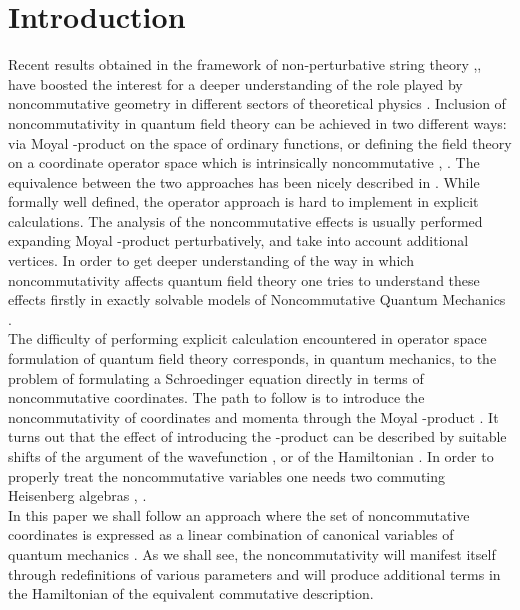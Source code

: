 \documentclass[a4paper,aps,prd,preprint]{revtex4}
\begin{document}
\section{Introduction}
Recent results obtained in the framework of non-perturbative string theory
\cite{witten},\cite{sw}, have boosted the interest for a deeper 
understanding of the role played by noncommutative geometry in different 
sectors of theoretical physics \cite{schw}. 
Inclusion of noncommutativity in quantum field theory 
can be achieved in two different ways: via Moyal \myHighlight{$\ast$}\coordHE{}-product on the space of
ordinary functions, or defining the field
theory on a coordinate operator space which is intrinsically noncommutative
\cite{nekra}, \cite{presn}. The equivalence between the two approaches has been
nicely described in \cite{agw}. While formally well defined,
the operator approach is hard to implement  in explicit calculations. The
analysis of the noncommutative effects is usually performed expanding
Moyal \myHighlight{$\ast$}\coordHE{}-product  perturbatively, and take into account additional vertices.
In order to get
deeper understanding of the way in which noncommutativity affects quantum
field theory one tries to understand these effects firstly in exactly solvable
models  of Noncommutative Quantum Mechanics \cite{qm}. \\
The difficulty of performing explicit calculation encountered in  operator
space formulation of quantum field theory corresponds, in quantum mechanics,
to the problem  of  formulating a Schroedinger equation directly in terms
of noncommutative coordinates. The path to follow is to introduce the
noncommutativity of coordinates and momenta
 through the Moyal \myHighlight{$\ast$}\coordHE{}-product \cite{greci}. It turns out that the effect of
 introducing the  \myHighlight{$\ast$}\coordHE{}-product can be described by suitable shifts 
 of the argument of the wavefunction \cite{gamb}, or of the Hamiltonian
 \cite{jell}. In order to properly treat the noncommutative variables
 one needs two  commuting Heisenberg algebras \cite{nair}, \cite{bellucci}. \\
In this paper we shall follow an approach where the set of 
noncommutative coordinates \coordHE{} is expressed as a linear 
combination of canonical variables of quantum mechanics \coordHE{}.
As we shall see, the noncommutativity will manifest itself through
redefinitions of various parameters and will produce additional 
terms in the Hamiltonian of the equivalent commutative description.\\
\end{document}
